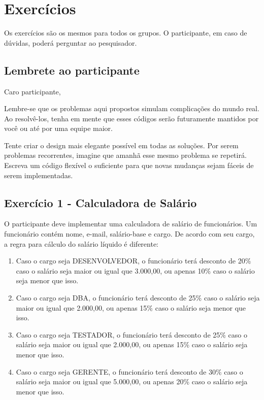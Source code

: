 \chapter{Exercícios}
\label{ape:exercicios}

Os exercícios são os mesmos para todos os grupos. O participante, em caso de dúvidas, poderá perguntar ao pesquisador.

\section{Lembrete ao participante}

Caro participante,

Lembre-se que os problemas aqui propostos simulam complicações do mundo real. 
Ao resolvê-los, tenha em mente que esses códigos serão futuramente mantidos
por você ou até por uma equipe maior.

Tente criar o design mais elegante possível em todas as soluções. Por serem problemas
recorrentes, imagine que amanhã esse mesmo problema se repetirá.
Escreva um código flexível o suficiente para que novas mudanças sejam fáceis de serem 
implementadas.

\section{Exercício 1 - Calculadora de Salário}

O participante deve implementar uma calculadora de salário de funcionários. Um
funcionário contém nome, e-mail, salário-base e cargo. De acordo com seu cargo,
a regra para cálculo do salário líquido é diferente:

\begin{enumerate}
	\item Caso o cargo seja DESENVOLVEDOR, o funcionário terá desconto de 20\%
	caso o salário seja maior ou igual que 3.000,00, ou apenas 10\% caso o salário seja menor 
	que isso.
	
	\item Caso o cargo seja DBA, o funcionário terá desconto de 25\%
	caso o salário seja maior ou igual que 2.000,00, ou apenas 15\% caso o salário seja menor 
	que isso.

	\item Caso o cargo seja TESTADOR, o funcionário terá desconto de 25\%
	caso o salário seja maior ou igual que 2.000,00, ou apenas 15\% caso o salário seja menor 
	que isso.
	
	\item Caso o cargo seja GERENTE, o funcionário terá desconto de 30\%
	caso o salário seja maior ou igual que 5.000,00, ou apenas 20\% caso o salário seja menor 
	que isso.
\end{enumerate}

